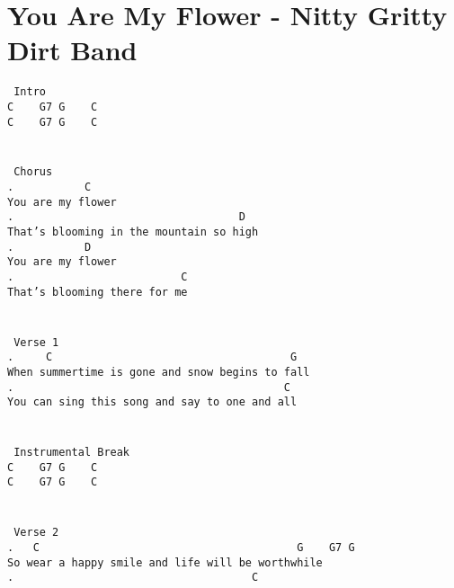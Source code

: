 \newpage
\section{You Are My Flower - Nitty Gritty Dirt Band}
\label{You Are My Flower - Nitty Gritty Dirt Band}
\texttt{\lbrack\ Intro\rbrack\\
C\ \ \ \ G7\ G\ \ \ \ C\\
C\ \ \ \ G7\ G\ \ \ \ C\\
\\
\\
\lbrack\ Chorus\rbrack\\
.\ \ \ \ \ \ \ \ \ \ \ C\\
You\ are\ my\ flower\\
.\ \ \ \ \ \ \ \ \ \ \ \ \ \ \ \ \ \ \ \ \ \ \ \ \ \ \ \ \ \ \ \ \ \ \ D\\
That's\ blooming\ in\ the\ mountain\ so\ high\\
.\ \ \ \ \ \ \ \ \ \ \ D\\
You\ are\ my\ flower\\
.\ \ \ \ \ \ \ \ \ \ \ \ \ \ \ \ \ \ \ \ \ \ \ \ \ \ C\\
That's\ blooming\ there\ for\ me\\
\\
\\
\lbrack\ Verse\ 1\rbrack\\
.\ \ \ \ \ C\ \ \ \ \ \ \ \ \ \ \ \ \ \ \ \ \ \ \ \ \ \ \ \ \ \ \ \ \ \ \ \ \ \ \ \ \ G\\
When\ summertime\ is\ gone\ and\ snow\ begins\ to\ fall\\
.\ \ \ \ \ \ \ \ \ \ \ \ \ \ \ \ \ \ \ \ \ \ \ \ \ \ \ \ \ \ \ \ \ \ \ \ \ \ \ \ \ \ C\\
You\ can\ sing\ this\ song\ and\ say\ to\ one\ and\ all\\
\\
\\
\lbrack\ Instrumental\ Break\rbrack\\
C\ \ \ \ G7\ G\ \ \ \ C\\
C\ \ \ \ G7\ G\ \ \ \ C\\
\\
\\
\lbrack\ Verse\ 2\rbrack\\
.\ \ \ C\ \ \ \ \ \ \ \ \ \ \ \ \ \ \ \ \ \ \ \ \ \ \ \ \ \ \ \ \ \ \ \ \ \ \ \ \ \ \ \ G\ \ \ \ G7\ G\\
So\ wear\ a\ happy\ smile\ and\ life\ will\ be\ worthwhile\\
.\ \ \ \ \ \ \ \ \ \ \ \ \ \ \ \ \ \ \ \ \ \ \ \ \ \ \ \ \ \ \ \ \ \ \ \ \ C\\
}
